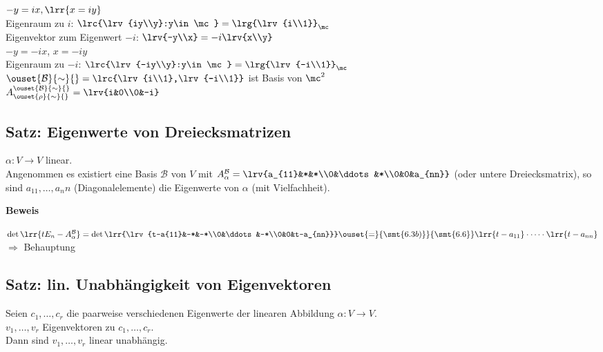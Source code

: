 \begin{enumerate}[a)]
    	  $-y=ix,\lrr{x=iy}$\\
    	  Eigenraum zu $i$: $\lrc{\lrv{iy\\y}:y\in\mc}=\lrg{\lrv{i\\1}}_\mc$\\
    	  Eigenvektor zum Eigenwert $-i$: $\lrv{-y\\x}=-i\lrv{x\\y}$\\
    	  $-y=-ix$, $x=-iy$\\
    	  Eigenraum zu $-i$: $\lrc{\lrv{-iy\\y}:y\in\mc}=\lrg{\lrv{-i\\1}}_\mc$\\
    	  $\ouset{\mathcal{B}}{\sim}{}=\lrc{\lrv{i\\1},\lrv{-i\\1}}$ ist Basis von $\mc^2$\\
    	  $A_{\ouset{\rho}{\sim}{}}^{\ouset{\mathcal{B}}{\sim}{}}=\lrv{i&0\\0&-i}$  
  \end{enumerate}

\subsection{Satz: Eigenwerte von Dreiecksmatrizen}
	$\alpha:V\rightarrow V$ linear.\\
	Angenommen es existiert eine Basis $\mathcal{B}$ von $V$ mit $A_\alpha^\mathcal{B}=\lrv{a_{11}&*&*\\0&\ddots&*\\0&0&a_{nn}}$ (oder untere Dreiecksmatrix), so sind $a_{11},\dots,{a_nn}$ (Diagonalelemente) die Eigenwerte von $\alpha$ (mit Vielfachheit).

	\textbf{Beweis}

	$\det\lrr{tE_n-A_\alpha^{\mathcal{B}}}=\det\lrr{\lrv{t-a{11}&-*&-*\\0&\ddots&-*\\0&0&t-a_{nn}}}\ouset{=}{\smt{6.3b)}}{\smt{6.6}}\lrr{t-a_{11}}\cdot\dots\cdot\lrr{t-a_{nn}}$\\
	$\Rightarrow$ Behauptung

\subsection{Satz: lin. Unabhängigkeit von Eigenvektoren}
	Seien $c_1,\dots,c_r$ die paarweise verschiedenen Eigenwerte der linearen Abbildung $\alpha: V\rightarrow V$.\\
	$v_1,\dots,v_r$ Eigenvektoren zu $c_1,\dots,c_r$.\\
	Dann sind $v_1,\dots,v_r$ linear unabhängig.


